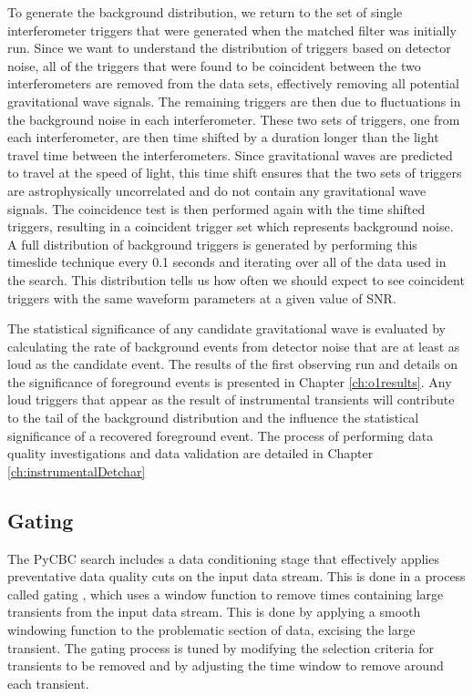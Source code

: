 To generate the background distribution, we return to the set of single interferometer 
triggers that were generated when the matched filter was initially run. Since we want 
to understand the distribution of triggers based on detector noise, all of the triggers 
that were found to be coincident between the two interferometers are removed from the 
data sets, effectively removing all
potential gravitational wave signals. The remaining triggers are then due to fluctuations 
in the background noise in each interferometer. These two sets of triggers,
one from each interferometer, are then time shifted by a duration longer than the
light travel time between the interferometers.
Since gravitational waves are predicted to travel at the speed of light,
this time shift ensures that the
two sets of triggers are astrophysically uncorrelated and do not contain any gravitational
wave signals. The coincidence test is then performed again with the time shifted triggers,
resulting in a coincident trigger set which represents background noise. 
A full distribution of background triggers is generated by performing this timeslide
technique every 0.1 seconds and iterating over all of the data used in the search. This 
distribution tells us how often we should expect to see coincident triggers with the 
same waveform parameters at a given value of SNR.

The statistical significance of any candidate gravitational wave is
evaluated by calculating the rate of background events from detector noise 
that are at least as
loud as the candidate event. The results of the first observing run and details on 
the significance of foreground events is presented in Chapter \ref{ch:o1results}. 
Any loud triggers that appear as the result of instrumental
transients will contribute to the tail of the background distribution and
the influence the statistical significance of a recovered foreground event.
The process of performing data quality investigations and data validation are 
detailed in Chapter \ref{ch:instrumentalDetchar}

\subsection{Gating}\label{sec:gating}

The PyCBC search includes a data conditioning stage that effectively applies preventative data quality
cuts on the input data stream. This is done in a process called gating \cite{Usman:2015kfa}, which uses a
window function to remove times containing large transients from the input data stream. This is done
by applying a smooth windowing function to the problematic section of data,
excising the large transient.
The gating process is tuned by modifying the selection criteria for transients to be removed and
by adjusting the time window to remove around each transient.

